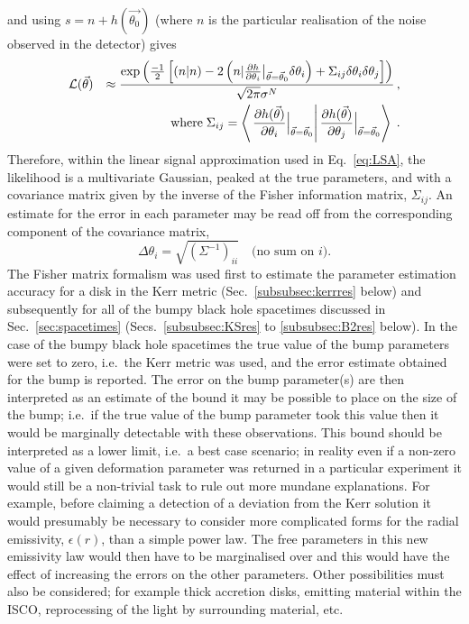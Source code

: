 and using $s=n+h(\vec{\theta_{0}})$ (where $n$ is the particular realisation of the noise observed in the detector) gives
\begin{eqnarray}\label{eq:likelihood2} 
&{\cal{L}}(\vec{\theta})&\approx \frac{\exp\left(\frac{-1}{2}\left[(n|n)-2\left(n|\frac{\partial h}{\partial\theta_{i}}\big|_{\vec{\theta}=\vec{\theta}_{0}}\delta\theta_{i}\right)+\Sigma_{ij}\delta\theta_{i}\delta\theta_{j}\right]\right)}{\sqrt{2\pi}\sigma^{N}}\, ,\nonumber\\
&&\;\textrm{where}\; \Sigma_{ij}=\left<\left.\frac{\partial h(\vec{\theta})}{\partial \theta_{i}}\Big|_{\vec{\theta}=\vec{\theta}_{0}}\right|\frac{\partial h(\vec{\theta})}{\partial \theta_{j}}\Big|_{\vec{\theta}=\vec{\theta}_{0}}\right> \; .\end{eqnarray}
Therefore, within the linear signal approximation used in Eq.\ \ref{eq:LSA}, the likelihood is a multivariate Gaussian, peaked at the true parameters, and with a covariance matrix given by the inverse of the Fisher information matrix, $\Sigma_{ij}$. An estimate for the error in each parameter may be read off from the corresponding component of the covariance matrix,
\begin{equation} \Delta\theta_{i}=\sqrt{\left(\Sigma^{-1}\right)_{ii}} \quad\textrm{(no sum on $i$).} \end{equation}
The Fisher matrix formalism was used first to estimate the parameter estimation accuracy for a disk in the Kerr metric (Sec.\ \ref{subsubsec:kerrres} below) and subsequently for all of the bumpy black hole spacetimes discussed in Sec.\ \ref{sec:spacetimes} (Secs.\ \ref{subsubsec:KSres} to \ref{subsubsec:B2res} below). In the case of the bumpy black hole spacetimes the true value of the bump parameters were set to zero, i.e.\ the Kerr metric was used, and the error estimate obtained for the bump is reported. The error on the bump parameter(s) are then interpreted as an estimate of the bound it may be possible to place on the size of the bump; i.e.\ if the true value of the bump parameter took this value then it would be marginally detectable with these observations. This bound should be interpreted as a lower limit, i.e.\ a best case scenario; in reality even if a non-zero value of a given deformation parameter was returned in a particular experiment it would still be a non-trivial task to rule out more mundane explanations. For example, before claiming a detection of a deviation from the Kerr solution it would presumably be necessary to consider more complicated forms for the radial emissivity, $\epsilon(r)$, than a simple power law. The free parameters in this new emissivity law would then have to be marginalised over and this would have the effect of increasing the errors on the other parameters. Other possibilities must also be considered; for example thick accretion disks, emitting material within the ISCO, reprocessing of the light by surrounding material, etc.

